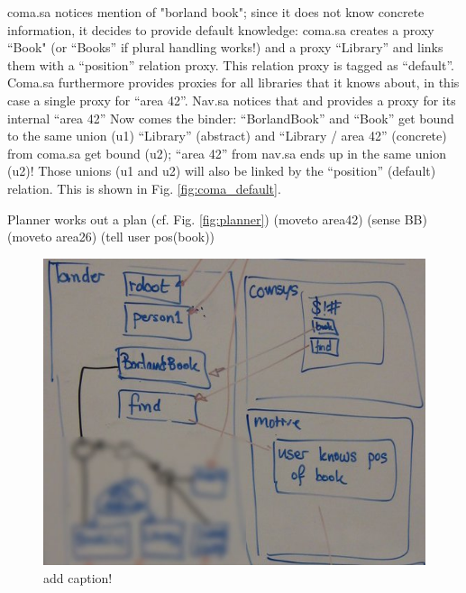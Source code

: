 \documentclass{article}
\begin{document}
	
	coma.sa notices mention of "borland book"; since it does not know
	concrete information, it decides to provide default knowledge:
	coma.sa creates a proxy ``Book" (or ``Books'' if plural handling works!)
	and a proxy ``Library'' and links them with a ``position'' relation proxy.
	This relation proxy is tagged as ``default''.
	Coma.sa furthermore provides proxies for all libraries that it knows about,
	in this case a single proxy for ``area 42''.
	Nav.sa notices that and provides a proxy for its internal ``area 42''
	Now comes the binder: 
	``BorlandBook'' and ``Book'' get bound to the same union (u1)
	``Library'' (abstract) and ``Library / area 42'' (concrete) from coma.sa get bound (u2);
	``area 42'' from nav.sa ends up in the same union (u2)!
	Those unions (u1 and u2) will also be linked by the ``position'' (default) relation.
	This is shown in Fig. \ref{fig:coma_default}.



	Planner works out a plan (cf. Fig. \ref{fig:planner})
	(moveto area42)
	(sense BB)
	(moveto area26)
	(tell user pos(book))

\begin{figure}[bth]
\centering
	\includegraphics[width=\linewidth]{explorer_2.jpg}
	\caption{add caption!} 
\label{fig:comsys_plan}
\end{figure}
\end{document}
